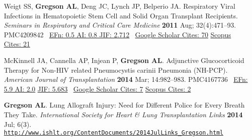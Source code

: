 \documentclass[letterpaper,10pt,sans,dvipsnames,final]{moderncv}%
\begin{document}
\begin{thebibliography}{1}
  \bibitem[4]{} Weigt SS, \textbf{Gregson AL}, Deng JC, Lynch JP, Belperio JA. Respiratory Viral Infections in Hematopoietic Stem Cell and Solid Organ Transplant Recipients. {\color{BrickRed}\textit{Seminars in Respiratory and Critical Care Medicine}} \textbf{2011} Aug; 32(4):471--93. \href{http://dx.doi.org/10.1055/s-0031-1283286}{\aiDoi} {\smaller PMC4209842}~ 
    {\color{NavyBlue} \href{http://www.eigenfactor.org/rankings.php?search=SEMINARS+IN+RESPIRATORY+AND+CRITICAL+CARE+MEDICINE&search2=&search3=&searchby=journal}{{\smaller EFn: 0.5 AI: 0.8 JIF: 2.712}}~
      \href{https://scholar.google.com/scholar?oi=bibs&hl=en&cites=3216870740609080793}{{\smaller Google Scholar Cites: 70}}
      \href{http://www.scopus.com/record/display.uri?eid=2-s2.0-80051960857&origin=resultslist&sort=plf-f&src=s&nlo=1&nlr=20&nls=&sid=4E3F003C86CD3B740CA1877B02032D8B.y7ESLndDIsN8cE7qwvy6w%3a3832&sot=anl&sdt=aut&sl=36&s=AU-ID%28%22Gregson%2c+Aric+L.%22+6603096521%29&relpos=10&citeCnt=21&searchTerm=AU-ID%28%5C%26quot%3BGregson%2C+Aric+L.%5C%26quot%3B+6603096521%29}{{\smaller Scopus Cites: 21}}
      }

  \bibitem[5]{} McKinnell JA, Cannella AP, Injean P, \textbf{Gregson AL}. Adjunctive Glucocorticoid Therapy for Non-{\smaller HIV} related Pneumocystis carinii Pneumonia ({\smaller NH-PCP}).
{\color{BrickRed}\textit{American Journal of Transplantation}} \textbf{2014} Mar; 14:982--983. \href{http://dx.doi.org/10.1111/ajt.12655}{\aiDoi} {\smaller PMC4167736}~
       {\color{NavyBlue}\href{http://52.6.43.8/projects/journalRank/rankings.php?bsearch=AMERICAN+JOURNAL+OF+TRANSPLANTATION&searchby=journal&orderby=eigenfactor}{{\smaller EFn: 5.9 AI: 2.0}} 
         \href{http://admin-apps.webofknowledge.com/JCR/JCR?RQ=RECORD&rank=1&journal=AM+J+TRANSPLANT}{{\smaller JIF: 5.683}}~
         \href{https://scholar.google.com/scholar?oi=bibs&hl=en&cites=7402623303252789264}{{\smaller Google Scholar Cites: 7}}
       \href{http://www.scopus.com/record/display.uri?eid=2-s2.0-84897116000&origin=resultslist&sort=plf-f&src=s&st1=&st2=&nlo=1&nlr=20&nls=&sid=4E3F003C86CD3B740CA1877B02032D8B.y7ESLndDIsN8cE7qwvy6w%3a2832&sot=anl&sdt=aut&sl=36&s=AU-ID%28%22Gregson%2c+Aric+L.%22+6603096521%29&relpos=4&citeCnt=2&searchTerm=AU-ID%28%5C%26quot%3BGregson%2C+Aric+L.%5C%26quot%3B+6603096521%29}{{\smaller Scopus Cites: 2}}
       }

  \bibitem[6]{} \textbf{Gregson AL}. Lung Allograft Injury: Need for Different Police for Every Breath They Take.
{\color{BrickRed}\textit{International Society for Heart \& Lung Transplantation Links}} \textbf{2014} Jul; 6(3). \href{http://www.ishlt.org/ContentDocuments/2014JulLinks_Gregson.html}{\nolinkurl{http://www.ishlt.org/ContentDocuments/2014JulLinks_Gregson.html}}


\end{thebibliography}
\end{document}
